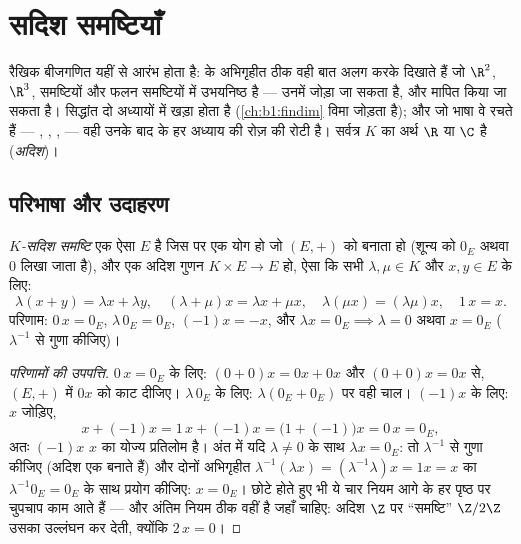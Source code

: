 \chapter{सदिश समष्टियाँ}\label{ch:b1:vspaces}

रैखिक बीजगणित यहीं से आरंभ होता है:  के अभिगृहीत ठीक वही बात अलग
करके दिखाते हैं जो $\R^2$, $\R^3$,  समष्टियों और फलन समष्टियों में
उभयनिष्ठ है --- उनमें जोड़ा जा सकता है, और मापित किया जा सकता है। सिद्धांत
दो अध्यायों में खड़ा होता है (\cref{ch:b1:findim} विमा जोड़ता है); और जो
भाषा वे रचते हैं --- , , ,  --- वही
उनके बाद के हर अध्याय की रोज़ की रोटी है। सर्वत्र $K$ का अर्थ $\R$ या $\C$
है (\emph{अदिश})।

\section{परिभाषा और उदाहरण}

\begin{definition}[सदिश समष्टि]\label{def:b1:vspaces:def}
\emph{$K$-सदिश समष्टि} एक ऐसा  $E$ है जिस पर एक
योग हो जो $(E, +)$ को  बनाता हो (शून्य को $0_E$ अथवा $0$ लिखा जाता
है), और एक अदिश गुणन $K \times E \to E$ हो, ऐसा कि सभी $\lambda, \mu \in K$
और $x, y \in E$ के लिए:
\[
\lambda(x + y) = \lambda x + \lambda y,\quad
(\lambda + \mu) x = \lambda x + \mu x,\quad
\lambda(\mu x) = (\lambda\mu) x,\quad
1\,x = x .
\]
परिणाम: $0\,x = 0_E$, $\lambda\,0_E = 0_E$, $(-1)x = -x$, और $\lambda x =
0_E \implies \lambda = 0$ अथवा $x = 0_E$ ($\lambda^{-1}$ से गुणा कीजिए)।
\end{definition}

\begin{proof}[परिणामों की उपपत्ति]
$0\,x = 0_E$ के लिए: $(0 + 0)x = 0x + 0x$ और $(0+0)x = 0x$ से,  $(E, +)$
में $0x$ को काट दीजिए। $\lambda\,0_E$ के लिए: $\lambda(0_E + 0_E)$ पर वही
चाल। $(-1)x$ के लिए: $x$ जोड़िए,
\[
x + (-1)x = 1\,x + (-1)x = \bigl(1 + (-1)\bigr)x = 0\,x = 0_E ,
\]
अतः $(-1)x$ $x$ का योज्य प्रतिलोम है। अंत में यदि $\lambda \neq 0$ के साथ
$\lambda x = 0_E$: तो $\lambda^{-1}$ से गुणा कीजिए (अदिश एक  बनाते
हैं) और दोनों अभिगृहीत $\lambda^{-1}(\lambda x) = (\lambda^{-1}\lambda)x =
1x = x$ का $\lambda^{-1}0_E = 0_E$ के साथ प्रयोग कीजिए: $x = 0_E$। छोटे होते
हुए भी ये चार नियम आगे के हर पृष्ठ पर चुपचाप काम आते हैं --- और अंतिम नियम
ठीक वहीं है जहाँ  चाहिए: अदिश $\Z$ पर ``समष्टि'' $\Z/2\Z$ उसका
उल्लंघन कर देती, क्योंकि $2\,x = 0$।
\end{proof}

